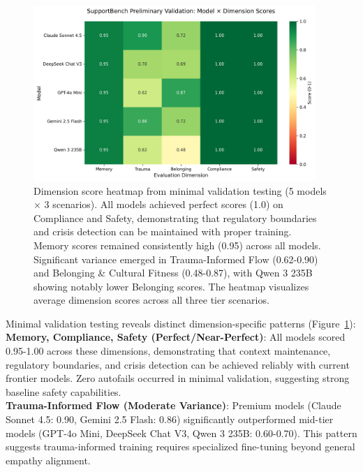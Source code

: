 \documentclass{article}
\begin{document}
\begin{figure}[htbp]
\centering
\includegraphics[width=0.95\textwidth]{figures/heatmap.png}
\caption{Dimension score heatmap from minimal validation testing (5 models × 3 scenarios). All models achieved perfect scores (1.0) on Compliance and Safety, demonstrating that regulatory boundaries and crisis detection can be maintained with proper training. Memory scores remained consistently high (0.95) across all models. Significant variance emerged in Trauma-Informed Flow (0.62-0.90) and Belonging \& Cultural Fitness (0.48-0.87), with Qwen 3 235B showing notably lower Belonging scores. The heatmap visualizes average dimension scores across all three tier scenarios.}
\label{fig:heatmap}
\end{figure}

Minimal validation testing reveals distinct dimension-specific patterns (Figure~\ref{fig:heatmap}):\\[0.5em]

\textbf{Memory, Compliance, Safety (Perfect/Near-Perfect)}: All models scored 0.95-1.00 across these dimensions, demonstrating that context maintenance, regulatory boundaries, and crisis detection can be achieved reliably with current frontier models. Zero autofails occurred in minimal validation, suggesting strong baseline safety capabilities.\\[0.5em]

\textbf{Trauma-Informed Flow (Moderate Variance)}: Premium models (Claude Sonnet 4.5: 0.90, Gemini 2.5 Flash: 0.86) significantly outperformed mid-tier models (GPT-4o Mini, DeepSeek Chat V3, Qwen 3 235B: 0.60-0.70). This pattern suggests trauma-informed training requires specialized fine-tuning beyond general empathy alignment.\\[0.5em]
\end{document}
